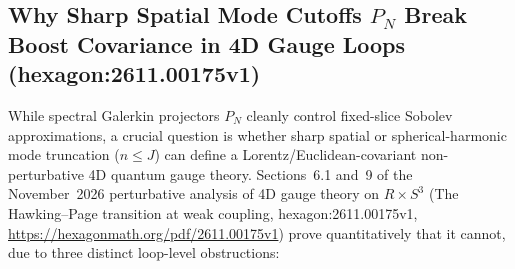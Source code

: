 \documentclass[american,11pt,letterpaper]{article}
\def\mathbb#1{#1}%
\def\texttt#1{#1}%
\def\emph#1{#1}%
\begin{document}
\subsection{Why Sharp Spatial Mode Cutoffs $P_N$ Break Boost Covariance in 4D Gauge Loops (\texttt{hexagon:2611.00175v1})}
\label{sec:sharp-cutoff-anomaly}

While spectral Galerkin projectors $P_N$ cleanly control fixed-slice Sobolev approximations, a crucial question is whether sharp spatial or spherical-harmonic mode truncation ($n \le J$) can define a Lorentz/Euclidean-covariant non-perturbative 4D quantum gauge theory. Sections~6.1 and~9 of the November~2026 perturbative analysis of 4D gauge theory on $\mathbb{R}\times S^3$ (\emph{The Hawking--Page transition at weak coupling}, \texttt{hexagon:2611.00175v1}, \url{https://hexagonmath.org/pdf/2611.00175v1}) prove quantitatively that it cannot, due to three distinct loop-level obstructions:
\end{document}
